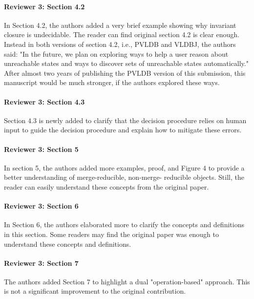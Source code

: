\documentclass[9pt]{article}
\begin{document}
\begin{multicols*}{2}
\paragraph{Reviewer 3: Section 4.2}
\begin{feedback}
  In Section 4.2, the authors added a very brief example showing why invariant
  closure is undecidable. The reader can find original section 4.2 is clear
  enough. Instead in both versions of section 4.2, i.e., PVLDB and VLDBJ, the
  authors said: "In the future, we plan on exploring ways to help a user reason
  about unreachable states and ways to discover sets of unreachable states
  automatically." After almost two years of publishing the PVLDB version of
  this submission, this manuscript would be much stronger, if the authors
  explored these ways.
\end{feedback}

\paragraph{Reviewer 3: Section 4.3}
\begin{feedback}
  Section 4.3 is newly added to clarify that the decision procedure relies on
  human input to guide the decision procedure and explain how to mitigate these
  errors.
\end{feedback}

\paragraph{Reviewer 3: Section 5}
\begin{feedback}
  In section 5, the authors added more examples, proof, and Figure 4 to provide
  a better understanding of merge-reducible, non-merge- reducible objects.
  Still, the reader can easily understand these concepts from the original
  paper.
\end{feedback}

\paragraph{Reviewer 3: Section 6}
\begin{feedback}
  In Section 6, the authors elaborated more to clarify the concepts and
  definitions in this section. Some readers may find the original paper was
  enough to understand these concepts and definitions.
\end{feedback}

\paragraph{Reviewer 3: Section 7}
\begin{feedback}
  The authors added Section 7 to highlight a dual "operation-based" approach.
  This is not a significant improvement to the original contribution.
\end{feedback}


\end{multicols*}
\end{document}
